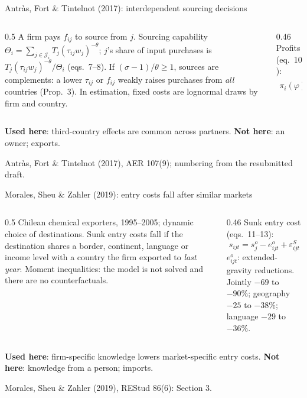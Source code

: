 \documentclass[notes,11pt, aspectratio=169]{beamer}
\newcommand{\src}[1]{\par\vfill{\scriptsize\color{gray}#1\par}}
\begin{document}
\begin{frame}[label=app-aft]{Antr\`as, Fort \& Tintelnot (2017): interdependent sourcing decisions}
\begin{columns}[T]
\begin{column}{0.5\textwidth}
\small
A firm pays $f_{ij}$ to source from $j$. Sourcing capability $\Theta_i=\sum_{j\in\mathcal J_i}T_j(\tau_{ij}w_j)^{-\theta}$; $j$'s share of input purchases is $T_j(\tau_{ij}w_j)^{-\theta}/\Theta_i$ (eqs.\ 7--8). If $(\sigma-1)/\theta\ge1$, sources are complements: a lower $\tau_{ij}$ or $f_{ij}$ weakly raises purchases from \emph{all} countries (Prop.\ 3). In estimation, fixed costs are lognormal draws by firm and country.
\end{column}
\begin{column}{0.46\textwidth}
\footnotesize
Profits (eq.\ 10):
\begin{align*}
\pi_i(\varphi)=&\,\varphi^{\sigma-1}(\gamma\Theta_i)^{\frac{\sigma-1}{\theta}}B_i\\
&-w_i\textstyle\sum_{j\in\mathcal J_i}f_{ij}
\end{align*}
\end{column}
\end{columns}
\small
\textbf{Used here}: third-country effects are common across partners. \textbf{Not here}: an owner; exports.
\src{Antr\`as, Fort \& Tintelnot (2017), AER 107(9); numbering from the resubmitted draft. \hyperlink{compare}{\beamerreturnbutton{Back}}}
\end{frame}


\begin{frame}[label=app-msz]{Morales, Sheu \& Zahler (2019): entry costs fall after similar markets}
\begin{columns}[T]
\begin{column}{0.5\textwidth}
\small
Chilean chemical exporters, 1995--2005; dynamic choice of destinations. Sunk entry costs fall if the destination shares a border, continent, language or income level with a country the firm exported to \emph{last year}. Moment inequalities: the model is not solved and there are no counterfactuals.
\end{column}
\begin{column}{0.46\textwidth}
\footnotesize
Sunk entry cost (eqs.\ 11--13):
\[
s_{ijt}=s_j^o-e^o_{ijt}+\varepsilon^S_{ijt}
\]
$e^o_{ijt}$: extended-gravity reductions. Jointly $-69$ to $-90\%$; geography $-25$ to $-38\%$; language $-29$ to $-36\%$.
\end{column}
\end{columns}
\small
\textbf{Used here}: firm-specific knowledge lowers market-specific entry costs. \textbf{Not here}: knowledge from a person; imports.
\src{Morales, Sheu \& Zahler (2019), REStud 86(6): Section 3. \hyperlink{compare}{\beamerreturnbutton{Back}}}
\end{frame}
\end{document}
